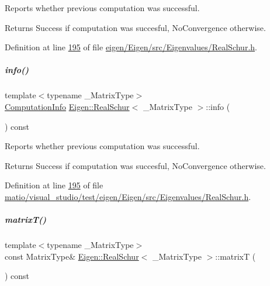 Reports whether previous computation was successful. 

\begin{DoxyReturn}{Returns}
{\ttfamily Success} if computation was succesful, {\ttfamily No\+Convergence} otherwise. 
\end{DoxyReturn}


Definition at line \hyperlink{eigen_2_eigen_2src_2_eigenvalues_2_real_schur_8h_source_l00195}{195} of file \hyperlink{eigen_2_eigen_2src_2_eigenvalues_2_real_schur_8h_source}{eigen/\+Eigen/src/\+Eigenvalues/\+Real\+Schur.\+h}.

\mbox{\label{group___eigenvalues___module_a386fd2b1a3a8401eca7183ac074deec8}} 
\subparagraph{\texorpdfstring{info()}{info()}\hspace{0.1cm}{\footnotesize\ttfamily [2/2]}}
{\footnotesize\ttfamily template$<$typename \+\_\+\+Matrix\+Type$>$ \\
\hyperlink{group__enums_ga85fad7b87587764e5cf6b513a9e0ee5e}{Computation\+Info} \hyperlink{group___eigenvalues___module_class_eigen_1_1_real_schur}{Eigen\+::\+Real\+Schur}$<$ \+\_\+\+Matrix\+Type $>$\+::info (\begin{DoxyParamCaption}{ }\end{DoxyParamCaption}) const\hspace{0.3cm}{\ttfamily [inline]}}



Reports whether previous computation was successful. 

\begin{DoxyReturn}{Returns}
{\ttfamily Success} if computation was succesful, {\ttfamily No\+Convergence} otherwise. 
\end{DoxyReturn}


Definition at line \hyperlink{matio_2visual__studio_2test_2eigen_2_eigen_2src_2_eigenvalues_2_real_schur_8h_source_l00195}{195} of file \hyperlink{matio_2visual__studio_2test_2eigen_2_eigen_2src_2_eigenvalues_2_real_schur_8h_source}{matio/visual\+\_\+studio/test/eigen/\+Eigen/src/\+Eigenvalues/\+Real\+Schur.\+h}.

\mbox{\label{group___eigenvalues___module_abb78996b43b8642a5f507415730445cb}} 
\subparagraph{\texorpdfstring{matrix\+T()}{matrixT()}\hspace{0.1cm}{\footnotesize\ttfamily [1/2]}}
{\footnotesize\ttfamily template$<$typename \+\_\+\+Matrix\+Type$>$ \\
const Matrix\+Type\& \hyperlink{group___eigenvalues___module_class_eigen_1_1_real_schur}{Eigen\+::\+Real\+Schur}$<$ \+\_\+\+Matrix\+Type $>$\+::matrixT (\begin{DoxyParamCaption}{ }\end{DoxyParamCaption}) const\hspace{0.3cm}{\ttfamily [inline]}}



